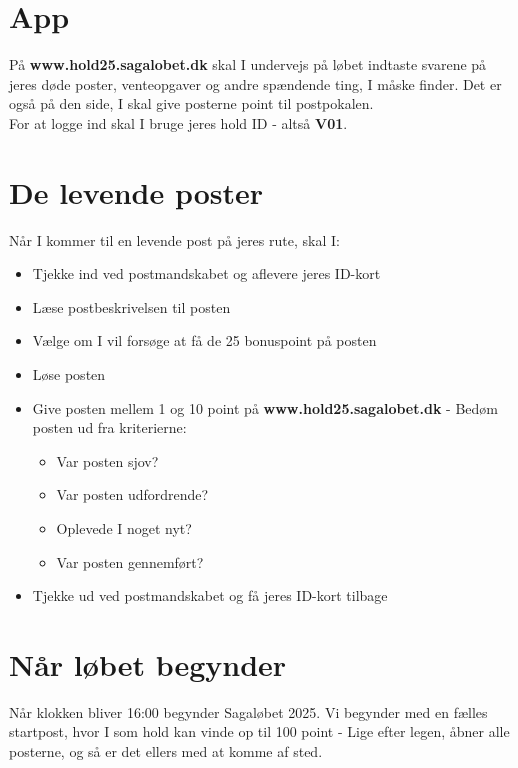 \section{App}
På \textbf{www.hold25.sagalobet.dk} skal I undervejs på løbet indtaste svarene på jeres døde poster, venteopgaver og andre spændende ting, I måske finder. Det er også på den side, I skal give posterne point til postpokalen.\\
For at logge ind skal I bruge jeres hold ID - altså \textbf{V01}.
\newpage
\section{De levende poster}
Når I kommer til en levende post på jeres rute, skal I:
\begin{itemize}
    \item Tjekke ind ved postmandskabet og aflevere jeres ID-kort
    \item Læse postbeskrivelsen til posten
    \item Vælge om I vil forsøge at få de 25 bonuspoint på posten
    \item Løse posten
    \item Give posten mellem 1 og 10 point på \textbf{www.hold25.sagalobet.dk} - Bedøm posten ud fra kriterierne:
    \begin{itemize}
        \item Var posten sjov?
        \item Var posten udfordrende?
        \item Oplevede I noget nyt?
        \item Var posten gennemført?
        \end{itemize}
    \item Tjekke ud ved postmandskabet og få jeres ID-kort tilbage
\end{itemize}
\section{Når løbet begynder}
Når klokken bliver 16:00 begynder Sagaløbet 2025. Vi begynder med en fælles startpost, hvor I som hold kan vinde op til 100 point - Lige efter legen, åbner alle posterne, og så er det ellers med at komme af sted.
